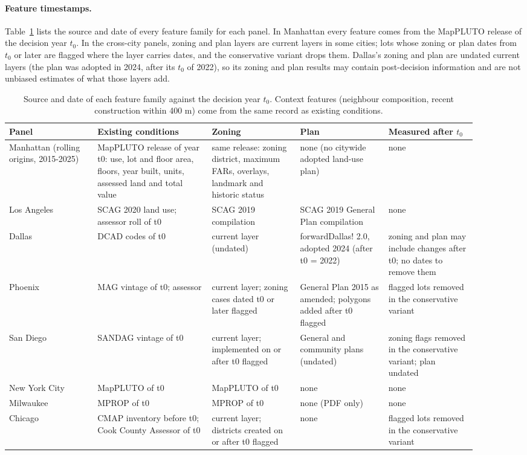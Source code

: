 \documentclass[10pt]{article}
\begin{document}
\paragraph{Feature timestamps.} Table~\ref{tab:s-timing} lists the source and date of every feature family for each
panel. In Manhattan every feature comes from the MapPLUTO release of the decision year $t_0$. In the cross-city panels,
zoning and plan layers are current layers in some cities; lots whose zoning or plan dates from $t_0$ or later are
flagged where the layer carries dates, and the conservative variant drops them. Dallas's zoning and plan are undated
current layers (the plan was adopted in 2024, after its $t_0$ of 2022), so its zoning and plan results may contain
post-decision information and are not unbiased estimates of what those layers add.

\begin{table}[t]
\centering
\footnotesize
\setlength{\tabcolsep}{4pt}
\caption{Source and date of each feature family against the decision year $t_0$. Context features (neighbour composition, recent construction within 400 m) come from the same record as existing conditions.}
\label{tab:s-timing}
\begin{tabular}{p{0.17\linewidth}p{0.22\linewidth}p{0.17\linewidth}p{0.17\linewidth}p{0.17\linewidth}}
\toprule
Panel & Existing conditions & Zoning & Plan & Measured after $t_0$ \\
\midrule
Manhattan (rolling origins, 2015-2025) & MapPLUTO release of year t0: use, lot and floor area, floors, year built, units, assessed land and total value & same release: zoning district, maximum FARs, overlays, landmark and historic status & none (no citywide adopted land-use plan) & none \\
Los Angeles & SCAG 2020 land use; assessor roll of t0 & SCAG 2019 compilation & SCAG 2019 General Plan compilation & none \\
Dallas & DCAD codes of t0 & current layer (undated) & forwardDallas! 2.0, adopted 2024 (after t0 = 2022) & zoning and plan may include changes after t0; no dates to remove them \\
Phoenix & MAG vintage of t0; assessor & current layer; zoning cases dated t0 or later flagged & General Plan 2015 as amended; polygons added after t0 flagged & flagged lots removed in the conservative variant \\
San Diego & SANDAG vintage of t0 & current layer; implemented on or after t0 flagged & General and community plans (undated) & zoning flags removed in the conservative variant; plan undated \\
New York City & MapPLUTO of t0 & MapPLUTO of t0 & none & none \\
Milwaukee & MPROP of t0 & MPROP of t0 & none (PDF only) & none \\
Chicago & CMAP inventory before t0; Cook County Assessor of t0 & current layer; districts created on or after t0 flagged & none & flagged lots removed in the conservative variant \\
\bottomrule
\end{tabular}
\end{table}
\end{document}
